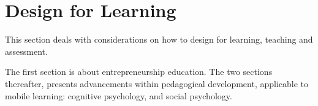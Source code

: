 \section{Design for Learning}


This section deals with considerations on how to design for learning, teaching and assessment.

The first section is about entrepreneurship education. The two sections thereafter, presents advancements within pedagogical development, applicable to mobile learning: cognitive psychology, and social psychology.






